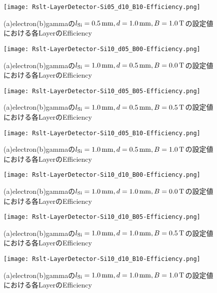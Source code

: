 \documentclass[a4paper,10pt]{jreport}
\begin{document}
\begin{figure}[H]
	\center
	\texttt{[image: Rslt-LayerDetector-Si05\_d10\_B10-Efficiency.png]}
	\caption{(a)electron(b)gammaの$l_{\rm{Si}}=\SI{0.5}{mm}, d=\SI{1.0}{mm}, B=\SI{1.0}{T}$の設定値における各LayerのEfficiency}
	\label{Rslt-LayerDetector-Si05_d10_B10-Efficiency}
\end{figure}

\begin{figure}[H]
	\center
	\texttt{[image: Rslt-LayerDetector-Si10\_d05\_B00-Efficiency.png]}
	\caption{(a)electron(b)gammaの$l_{\rm{Si}}=\SI{1.0}{mm}, d=\SI{0.5}{mm}, B=\SI{0.0}{T}$の設定値における各LayerのEfficiency}
	\label{Rslt-LayerDetector-Si10_d05_B00-Efficiency}
\end{figure}

\begin{figure}[H]
	\center
	\texttt{[image: Rslt-LayerDetector-Si10\_d05\_B05-Efficiency.png]}
	\caption{(a)electron(b)gammaの$l_{\rm{Si}}=\SI{1.0}{mm}, d=\SI{0.5}{mm}, B=\SI{0.5}{T}$の設定値における各LayerのEfficiency}
	\label{Rslt-LayerDetector-Si10_d05_B05-Efficiency}
\end{figure}

\begin{figure}[H]
	\center
	\texttt{[image: Rslt-LayerDetector-Si10\_d05\_B10-Efficiency.png]}
	\caption{(a)electron(b)gammaの$l_{\rm{Si}}=\SI{1.0}{mm}, d=\SI{0.5}{mm}, B=\SI{1.0}{T}$の設定値における各LayerのEfficiency}
	\label{Rslt-LayerDetector-Si10_d05_B10-Efficiency}
\end{figure}

\begin{figure}[H]
	\center
	\texttt{[image: Rslt-LayerDetector-Si10\_d10\_B00-Efficiency.png]}
	\caption{(a)electron(b)gammaの$l_{\rm{Si}}=\SI{1.0}{mm}, d=\SI{1.0}{mm}, B=\SI{0.0}{T}$の設定値における各LayerのEfficiency}
	\label{Rslt-LayerDetector-Si10_d10_B00-Efficiency}
\end{figure}

\begin{figure}[H]
	\center
	\texttt{[image: Rslt-LayerDetector-Si10\_d10\_B05-Efficiency.png]}
	\caption{(a)electron(b)gammaの$l_{\rm{Si}}=\SI{1.0}{mm}, d=\SI{1.0}{mm}, B=\SI{0.5}{T}$の設定値における各LayerのEfficiency}
	\label{Rslt-LayerDetector-Si10_d10_B05-Efficiency}
\end{figure}

\begin{figure}[H]
	\center
	\texttt{[image: Rslt-LayerDetector-Si10\_d10\_B10-Efficiency.png]}
	\caption{(a)electron(b)gammaの$l_{\rm{Si}}=\SI{1.0}{mm}, d=\SI{1.0}{mm}, B=\SI{1.0}{T}$の設定値における各LayerのEfficiency}
	\label{Rslt-LayerDetector-Si10_d10_B10-Efficiency}
\end{figure}
\end{document}
